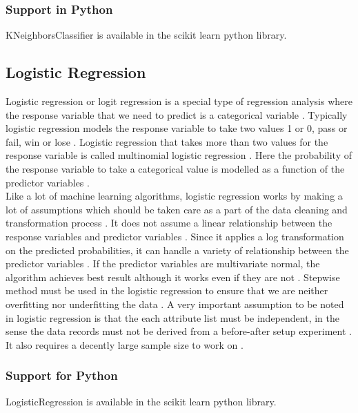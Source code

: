 \documentclass[sigconf]{acmart}
\begin{document}
\subsubsection{Support in Python} 
KNeighborsClassifier is available in the scikit learn python library. 

\subsection{Logistic Regression}
Logistic regression or logit regression is a special type of regression analysis where the response variable that we need to predict is a categorical variable \cite{book-tan}. Typically logistic regression models the response variable to take two values 1 or 0, pass or fail, win or lose \cite{book-tan}. Logistic regression that takes more than two values for the response variable is called multinomial logistic regression \cite{book-tan}. Here the probability of the response variable to take a categorical value is modelled as a function of the predictor variables \cite{book-tan}. \\

Like a lot of machine learning algorithms, logistic regression works by making a lot of assumptions which should be taken care as a part of the data cleaning and transformation process \cite{book-shai}. It does not assume a linear relationship between the response variables and predictor variables \cite{book-shai}. Since it applies a log transformation on the predicted probabilities, it can handle a variety of relationship between the predictor variables \cite{book-shai}. If the predictor variables are multivariate normal, the algorithm achieves best result although it works even if they are not \cite{book-shai}. Stepwise method must be used in the logistic regression to ensure that we are neither overfitting nor underfitting the data \cite{book-shai}. A very important assumption to be noted in logistic regression is that the each attribute list must be independent, in the sense the data records must not be derived from a before-after setup experiment \cite{book-shai}. It also requires a decently large sample size to work on \cite{book-shai}. 

\subsubsection{Support for Python} LogisticRegression is available in the scikit learn python library.
\end{document}
